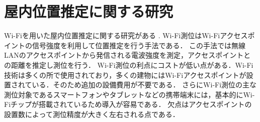 


\section{屋内位置推定に関する研究}\label{2.1}


Wi-Fiを用いた屋内位置推定に関する研究がある\cite{wifi0} \cite{wifi1}.
Wi-Fi測位はWi-Fiアクセスポイントの信号強度を利用して位置推定を行う手法である．
この手法では無線LANのアクセスポイントから発信される電波強度を測定，アクセスポイントとの距離を推定し測位を行う．
Wi-Fi測位の利点にコストが低い点がある．Wi-Fi技術は多くの所で使用されており，多くの建物にはWi-Fiアクセスポイントが設置されている．そのため追加の設備費用が不要である．
さらにWi-Fi測位の主な測位対象であるスマートフォンやタブレットなどの携帯端末には，基本的にWi-Fiチップが搭載されているため導入が容易である．
欠点はアクセスポイントの設置数によって測位精度が大きく左右される点である．



